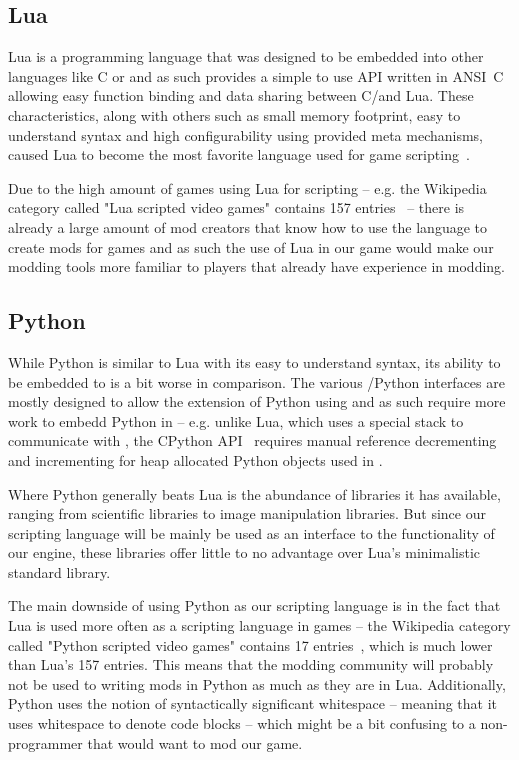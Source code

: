 \subsection{Lua}

Lua is a programming language that was designed to be embedded into other languages like C or \cpp and as such
provides a simple to use API written in ANSI~C allowing easy function
binding and data sharing between C/\cpp and Lua. These characteristics, along with others such as small memory
footprint, easy to understand syntax and
high configurability using provided meta mechanisms, caused Lua to become the most favorite language used for game 
scripting~\cite{EngineSurvey}.

Due to the high amount of games using Lua for scripting -- e.g. the Wikipedia category called "Lua scripted video games" contains
157 entries~\cite{LuaScriptedVGs} -- there is already a large amount of mod creators that know how to use the language to
create mods for games and as such the use of Lua in our game would make our modding tools more familiar to players that already have
experience in modding.

\subsection{Python}

While Python is similar to Lua with its easy to understand syntax, its ability to be embedded to \cpp is a bit worse in comparison.
The various \cpp/Python interfaces are mostly designed to allow the extension of Python using \cpp and as such require more
work to embedd Python in \cpp -- e.g. unlike Lua, which uses a special stack to communicate with \cpp, the CPython API~\cite{CPython}
requires manual reference decrementing and incrementing for heap allocated Python objects used in \cpp.

Where Python generally beats Lua is the abundance of libraries it has available, ranging from scientific libraries to image manipulation
libraries. But since our scripting language will be mainly be used as an interface to the functionality of our engine, these libraries
offer little to no advantage over Lua's minimalistic standard library.

The main downside of using Python as our scripting language is in the fact that Lua is used more often as a scripting language in games
-- the Wikipedia category called "Python scripted video games" contains 17 entries~\cite{PythonScriptedVGs}, which is much lower
than Lua's 157 entries. This means that the modding community will probably not be used to writing mods in Python as much as they are
in Lua. Additionally, Python uses the notion of syntactically significant whitespace -- meaning that it uses whitespace to denote
code blocks -- which might be a bit confusing to a non-programmer that would want to mod our game.

